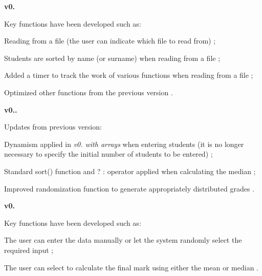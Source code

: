 {\bfseries{v0.}}

Key functions have been developed such as\+:


\begin{DoxyItemize}
\item {\ttfamily Reading} from a {\ttfamily file} (the user can indicate which file to read from) ;
\item Students are {\ttfamily sorted} by name (or surname) when reading from a {\ttfamily file} ;
\item Added a {\ttfamily timer to track the work} of various functions when reading from a file ;
\item {\ttfamily Optimized} other {\ttfamily functions} from the previous version .
\end{DoxyItemize}

{\bfseries{v0..}}

Updates from previous version\+:


\begin{DoxyItemize}
\item {\ttfamily Dynamism applied} in {\itshape v0. with arrays} when entering students (it is no longer necessary to specify the initial number of students to be entered) ;
\item Standard {\ttfamily sort()} function and {\ttfamily ? \+:} operator {\ttfamily applied} when calculating the median ;
\item {\ttfamily Improved randomization} function to generate appropriately distributed grades .
\end{DoxyItemize}

{\bfseries{v0.}}

Key functions have been developed such as\+:


\begin{DoxyItemize}
\item The user can {\ttfamily enter} the data {\ttfamily manually} or let the system {\ttfamily randomly} select the required input ;
\item The user can {\ttfamily select} to calculate the final mark using either {\ttfamily the mean} or {\ttfamily median} . 
\end{DoxyItemize}